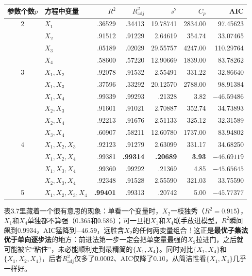 \par\noindent\begin{minipage}{\linewidth}
\begin{center}\small\setlength{\tabcolsep}{5pt}
\begin{tabular}{clrrrrr}
\toprule 参数个数$p$&方程中变量&$R^2$&$R_{\mathrm{adj}}^2$&$s^2$&$C_p$&AIC\\\midrule
2&$X_1$&.36529&.34413&19.78741&2834.00&97.45623\\
 &$X_2$&.91512&.91229&2.64619&354.74&33.07465\\
 &$X_3$&.05189&.02029&29.55757&4247.00&110.29764\\
 &$X_4$&.58600&.57220&12.90669&1839.00&83.78262\\
3&$X_1,X_2$&.92078&.91532&2.55491&331.22&32.86640\\
 &$X_1,X_3$&.37596&.33292&20.12570&2788.00&98.91384\\
 &$X_1,X_4$&.99339&.99293&.21328&3.82&$-46.59486$\\
 &$X_2,X_3$&.91601&.91021&2.70887&352.74&34.73893\\
 &$X_2,X_4$&.92213&.91676&2.51133&325.12&32.31589\\
 &$X_3,X_4$&.60907&.58211&12.60780&1737.00&83.94802\\
4&$X_1,X_2,X_3$&.92123&.91279&2.63099&331.17&34.68250\\
 &$X_1,X_2,X_4$&.99381&\textbf{.99314}&\textbf{.20689}&\textbf{3.93}&$\mathbf{-46.69119}$\\
 &$X_1,X_3,X_4$&.99360&.99292&.21369&4.85&$-45.65645$\\
 &$X_2,X_3,X_4$&.92348&.91528&2.55590&321.03&33.75590\\
5&$X_1,X_2,X_3,X_4$&\textbf{.99401}&.99313&.20742&5.00&$-45.77377$\\\bottomrule
\end{tabular}\end{center}
\end{minipage}\par\medskip

表3.7里藏着一个很有意思的现象：单看一个变量时，$X_2$一枝独秀（$R^2=0.915$），$X_1$和$X_4$单独都不算强（$0.365$和$0.586$）；可一旦把$X_1$和$X_4$联手放进模型，$R^2$瞬间飙到$0.9934$，AIC猛降到$-46.59$，远胜含$X_2$的任何两变量组合！这正是\textbf{最优子集法优于单向逐步法}的地方：前进法第一步一定会把单变量最强的$X_2$拉进门，之后就可能被它“粘住”，未必能顺利走到最精简的$\{X_1,X_4\}$。同时对比$\{X_1,X_4\}$和$\{X_1,X_2,X_4\}$，后者$R_{\mathrm{adj}}^2$仅多了$0.0002$、AIC仅降了$0.10$，从简洁性看$\{X_1,X_4\}$几乎一样好。

